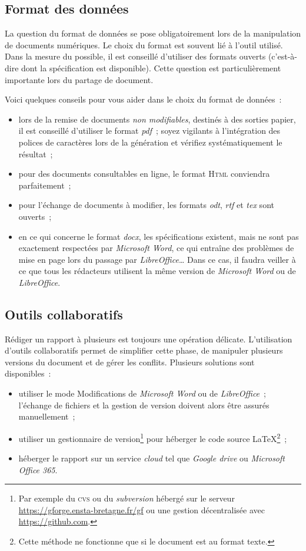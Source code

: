 \subsection{Format des données}

La question du format de données se pose obligatoirement lors de la
manipulation de documents numériques. Le choix du format est souvent lié à
l'outil utilisé. Dans la mesure du possible, il est conseillé d'utiliser des
formats ouverts (c'est-à-dire dont la spécification est disponible).
Cette question est particulièrement importante lors du partage de document.

Voici quelques conseils pour vous aider dans le choix du format de données~:
\begin{itemize}
\item lors de la remise de documents \emph{non modifiables}, destinés à des
  sorties papier, il est conseillé d'utiliser le format \emph{pdf}~; soyez
  vigilants à l'intégration des polices de caractères lors de la génération et
  vérifiez systématiquement le résultat~; 
\item pour des documents consultables en ligne, le format \textsc{Html}
  conviendra parfaitement~;
\item pour l'échange de documents à modifier, les formats \emph{odt},
  \emph{rtf} et \emph{tex} sont ouverts~;
\item en ce qui concerne le format \emph{docx}, les spécifications existent,
  mais ne sont pas exactement respectées par \emph{Microsoft Word}, ce qui
  entraîne des problèmes de mise en page lors du passage par
  \emph{LibreOffice}\ldots{} Dans ce cas, il faudra veiller à ce que tous les
  rédacteurs utilisent la même version de \emph{Microsoft Word} ou de
  \emph{LibreOffice}. 
\end{itemize}

\subsection{Outils collaboratifs}

Rédiger un rapport à plusieurs est toujours une opération
délicate. L'utilisation d'outils collaboratifs permet de simplifier cette
phase, de manipuler plusieurs versions du document et de gérer les conflits.
Plusieurs solutions sont disponibles~:
\begin{itemize}
\item utiliser le mode \og{}Modifications\fg{} de \emph{Microsoft Word} ou de
  \emph{LibreOffice}~; l'échange de fichiers et la gestion de version doivent
  alors être assurés manuellement~;
\item utiliser un gestionnaire de version\footnote{Par exemple du \textsc{cvs}
  ou du \emph{subversion} hébergé sur le serveur
  \url{https://gforge.ensta-bretagne.fr/gf} ou une gestion décentralisée avec
  \url{https://github.com}.} pour héberger le code source
\LaTeX\footnote{Cette méthode ne fonctionne que si le document est au format
  texte.}~;
\item héberger le rapport sur un service \emph{cloud} tel que
  \emph{Google drive} ou \emph{Microsoft Office 365}.
\end{itemize}

